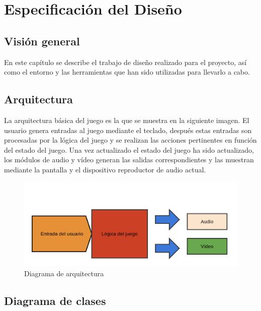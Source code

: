 \chapter{Especificación del Diseño}

\section{Visión general}

	En este capítulo se describe el trabajo de diseño realizado para el proyecto, así como el entorno y las herramientas que han sido utilizadas para llevarlo a cabo.

\section{Arquitectura}

	La arquitectura básica del juego es la que se muestra en la siguiente imagen. El usuario genera entradas al juego mediante el teclado, después estas entradas son procesadas por la lógica del juego y se realizan las acciones pertinentes en función del estado del juego. Una vez actualizado el estado del juego ha sido actualizado, los módulos de audio y vídeo generan las salidas correspondientes y las muestran mediante la pantalla y el dispositivo reproductor de audio actual.

	\begin{figure}[!htp]
		 \centering
		 \includegraphics[scale=.15]{fig/architecture}
		 \caption{Diagrama de arquitectura}
		 \label{fig:arch}
	\end{figure}

	\FloatBarrier

\section{Diagrama de clases}

